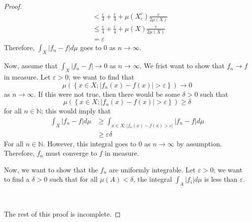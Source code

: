 \documentclass[12pt]{article}
\newcommand{\N}{\mathbb{N}}
\theoremstyle{definition}
\newenvironment{problem}[2][Problem]{\begin{trivlist}
\item[\hskip \labelsep {\bfseries #1}\hskip \labelsep {\bfseries #2.}]}{\end{trivlist}}
\begin{document}
\begin{problem}{5}
\begin{proof}
\begin{align*}
			&< \frac{\varepsilon}{4} + \frac{\varepsilon}{4} + \mu(X_\varepsilon^c) \frac{\varepsilon}{2\mu(X)}\\
			&\leq \frac{\varepsilon}{4} + \frac{\varepsilon}{4 } + \mu(X) \frac{\varepsilon}{2\mu(X)}\\
			&= \varepsilon
		\end{align*}
		Therefore, $\int_X \left \lvert { f_n - f } \right \lvert d\mu$ goes to $0$ as $n \to \infty$.
		\par Now, assume that $\int_X \left \lvert { f_n - f } \right \lvert  \to 0$ as $n \to \infty$. We frist want to show that $f_n \to f$ in measure. Let $\varepsilon > 0$; we want to find that 
		\[\mu(\left\{ x \in X; \left \lvert { f_n(x) - f(x) } \right \lvert > \varepsilon \right\}) \to 0\]
		as $n \to \infty$. If this were not true, then there would be some $\delta > 0$ such that
		\[\mu(\left\{ x \in X; \left \lvert { f_n(x) - f(x) } \right \lvert > \varepsilon \right\}) \geq \delta\]
		for all $n \in \N$; this would imply that
		\begin{align*}\int_X \left \lvert { f_n - f } \right \lvert d\mu &\geq \int_{x \in X; \left \lvert { f_n(x) - f(x) > \varepsilon } \right \lvert } \left \lvert { f_n - f } \right \lvert d\mu\\
		&\geq \varepsilon \delta\end{align*}
		For all $n \in \N$. However, this integral goes to $0$ as $n \to \infty$ by assumption. Therefore, $f_n$ must converge to $f$ in measure. 
		\par Now, we want to show that the $f_n$ are uniformly integrable. Let $\varepsilon > 0$; we want to find a $\delta > 0$ such that for all $\mu(A) < \delta$, the integral $\int_A \left \lvert { f_i } \right \lvert d\mu$ is less than $\varepsilon$. 
		\par \;\\ \par The rest of this proof is incomplete.
	\end{proof}
\end{problem}
\end{document}
